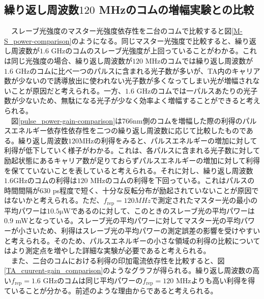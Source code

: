 \documentclass[uplatex, dvipdfmx, a4paper, report, papersize, 11pt]{jsbook}
\begin{document}
\subsection{繰り返し周波数$120$ MHzのコムの増幅実験との比較}
　スレーブ光強度のマスター光強度依存性を二台のコムで比較すると図\ref{M-S_power-comparison}のようになる。同じマスター光強度で比較すると、繰り返し周波数が$1.6$ GHzのコムのスレーブ光強度が上回っていることがわかる。これは同じ光強度の場合、繰り返し周波数が$120$ MHzのコムでは繰り返し周波数が$1.6$ GHzのコムに比べ一つのパルスに含まれる光子数が多いが、TA内のキャリア数が少ないので誘導放出に使われない光子数が多くなってしまい光が増幅されないことが原因だと考えられる。一方、$1.6$ GHzのコムでは一パルスあたりの光子数が少ないため、無駄になる光子が少なく効率よく増幅することができると考えられる。\\
　図\ref{pulse_power-gain-comparison}は766nm側のコムを増幅した際の利得のパルスエネルギー依存性依存性を二つの繰り返し周波数に応じて比較したものである。繰り返し周波数$120 \mathrm{MHz}$の利得をみると、パルスエネルギーの増加に対して利得が低下していく様子がわかる。これは、各パルスに含まれる光子数に対して励起状態にあるキャリア数が足りておらずパルスエネルギーの増加に対して利得を保てていないことを表していると考えられる。それに対し、繰り返し周波数$1.6 \mathrm{GHz}$のコムの利得は$120$ MHzのコムの利得を下回っている。これはパルスの時間間隔が$630$ ps程度で短く、十分な反転分布が励起されていないことが原因ではないかと考えられる。ただ、$f_\mathrm{rep} = 120MHz$で測定されたマスター光の最小の平均パワーは$10.5 \mathrm{\mu W}$であるのに対して、このときのスレーブ光の平均パワーは$0.9$ mWとなっている。スレーブ光の平均パワーに対してマスター光の平均パワーが小さいため、利得はスレーブ光の平均パワーの測定誤差の影響を受けやすいと考えられる。そのため、パルスエネルギーの小さな領域の利得の比較についてはより測定点を増やした詳細な実験が必要であると考えられる。\\
　また、二台のコムにおける利得の印加電流依存性を比較すると、図\ref{TA_cuurent-gain_comparison}のようなグラフが得られる。繰り返し周波数の高い$f_\mathrm{rep} = 1.6$ GHzのコムは同じ平均パワーの$f_\mathrm{rep} = 120$ MHzよりも高い利得を得ていることが分かる。前述のような理由からであると考えられる。
\end{document}
